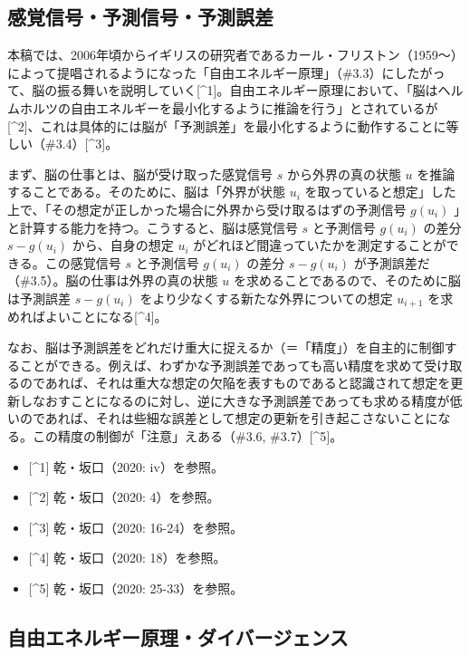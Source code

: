 \subsection{感覚信号・予測信号・予測誤差}\label{ux611fux899aux4fe1ux53f7ux4e88ux6e2cux4fe1ux53f7ux4e88ux6e2cux8aa4ux5dee}

本稿では、2006年頃からイギリスの研究者であるカール・フリストン（1959～）によって提唱されるようになった「自由エネルギー原理」（\#3.3）にしたがって、脳の振る舞いを説明していく{[}\^{}1{]}。自由エネルギー原理において、「脳はヘルムホルツの自由エネルギーを最小化するように推論を行う」とされているが{[}\^{}2{]}、これは具体的には脳が「予測誤差」を最小化するように動作することに等しい（\#3.4）{[}\^{}3{]}。

まず、脳の仕事とは、脳が受け取った感覚信号 \(s\) から外界の真の状態
\(u\) を推論することである。そのために、脳は「外界が状態 \(u_i\)
を取っていると想定」した上で、「その想定が正しかった場合に外界から受け取るはずの予測信号
\(g(u_i)\) 」と計算する能力を持つ。こうすると、脳は感覚信号 \(s\)
と予測信号 \(g(u_i)\) の差分 \(s-g(u_i)\) から、自身の想定 \(u_i\)
がどれほど間違っていたかを測定することができる。この感覚信号 \(s\)
と予測信号 \(g(u_i)\) の差分 \(s-g(u_i)\)
が予測誤差だ（\#3.5）。脳の仕事は外界の真の状態 \(u\)
を求めることであるので、そのために脳は予測誤差 \(s-g(u_i)\)
をより少なくする新たな外界についての想定 \(u_{i+1}\)
を求めればよいことになる{[}\^{}4{]}。

なお、脳は予測誤差をどれだけ重大に捉えるか（＝「精度」）を自主的に制御することができる。例えば、わずかな予測誤差であっても高い精度を求めて受け取るのであれば、それは重大な想定の欠陥を表すものであると認識されて想定を更新しなおすことになるのに対し、逆に大きな予測誤差であっても求める精度が低いのであれば、それは些細な誤差として想定の更新を引き起こさないことになる。この精度の制御が「注意」えある（\#3.6,
\#3.7）{[}\^{}5{]}。

\begin{itemize}
\tightlist
\item
  {[}\^{}1{]} 乾・坂口（2020: iv）を参照。
\item
  {[}\^{}2{]} 乾・坂口（2020: 4）を参照。
\item
  {[}\^{}3{]} 乾・坂口（2020: 16-24）を参照。
\item
  {[}\^{}4{]} 乾・坂口（2020: 18）を参照。
\item
  {[}\^{}5{]} 乾・坂口（2020: 25-33）を参照。
\end{itemize}

\subsection{自由エネルギー原理・ダイバージェンス}\label{ux81eaux7531ux30a8ux30cdux30ebux30aeux30fcux539fux7406ux30c0ux30a4ux30d0ux30fcux30b8ux30a7ux30f3ux30b9}

